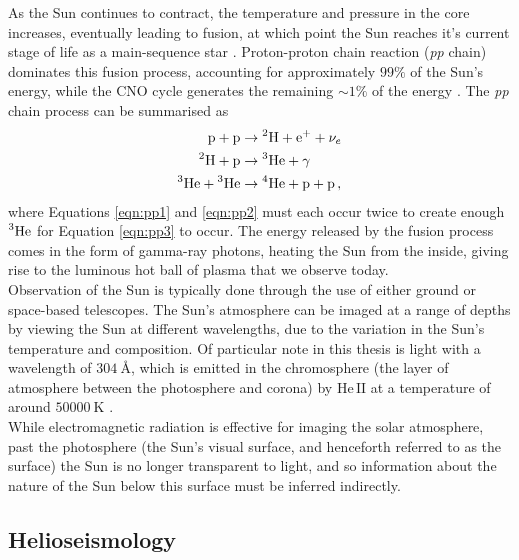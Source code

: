 \documentclass[11pt,a4paper,onecolumn]{report}
\newcommand*\chem[1]{\ensuremath{\mathrm{#1}}}
\begin{document}
As the Sun continues to contract, the temperature and pressure in the core
increases, eventually leading to fusion, at which point the Sun reaches it's
current stage of life as a main-sequence star \citep{woolfson_origin_2000}.
Proton-proton chain reaction (\textit{pp} chain) dominates this fusion process,
accounting for approximately $99\%$ of the Sun's energy, while the CNO cycle
generates the remaining \(\sim 1\%\) of the energy \citep{adelberger_solar_2011}.
The \textit{pp} chain process can be summarised as
\begin{align}
  \chem{p} + \chem{p} &\rightarrow \chem{\prescript{2}{}H} + \chem{e^+} +
  \nu_e \label{eqn:pp1}\\
  \chem{\prescript{2}{}H} + \chem{p} &\rightarrow \chem{\prescript{3}{}He}
  + \gamma \label{eqn:pp2}\\
  \chem{\prescript{3}{}He} + \chem{\prescript{3}{}He} & \rightarrow
  \chem{\prescript{4}{}He} + \chem{p} + \chem{p}\,, \label{eqn:pp3}
\end{align}
where Equations \ref{eqn:pp1} and \ref{eqn:pp2} must each occur twice to create
enough $\chem{\prescript{3}{}He}$ for Equation \ref{eqn:pp3} to occur. The
energy released by the fusion process comes in the form of gamma-ray photons,
heating the Sun from the inside, giving rise to the luminous hot ball of plasma
that we observe today. \\


Observation of the Sun is typically done through the use of either ground or
space-based telescopes. The Sun's atmosphere can be imaged at a range of depths
by viewing the Sun at different wavelengths, due to the variation in the Sun's
temperature and composition. Of particular note in this thesis is light with a
wavelength of \(\SI{304}{\angstrom}\), which is emitted in the chromosphere (the
layer of atmosphere between the photosphere and corona) by \(\chem{He \, II}\)
at a temperature of around \(\SI{50000}{\kelvin}\)
\citep{herbert_friedman_solar_1962}. \\

While electromagnetic radiation is effective for imaging the solar atmosphere,
past the photosphere (the Sun's visual surface, and henceforth referred to as
the surface) the Sun is no longer transparent to light, and so information about
the nature of the Sun below this surface must be inferred indirectly. \\


%
\subsection{Helioseismology}
%
\label{sec:HSM}
\end{document}
